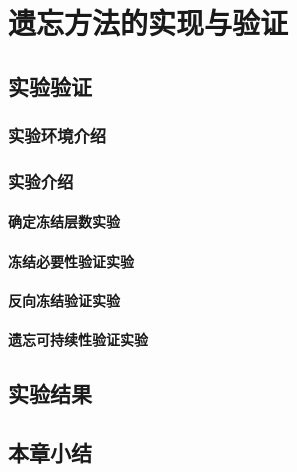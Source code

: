 
\chapter{遗忘方法的实现与验证}

\section{实验验证}

\subsection{实验环境介绍}

\subsection{实验介绍}

\subsubsection{确定冻结层数实验}
\subsubsection{冻结必要性验证实验}
\subsubsection{反向冻结验证实验}
\subsubsection{遗忘可持续性验证实验}

\section{实验结果}

\section{本章小结}

